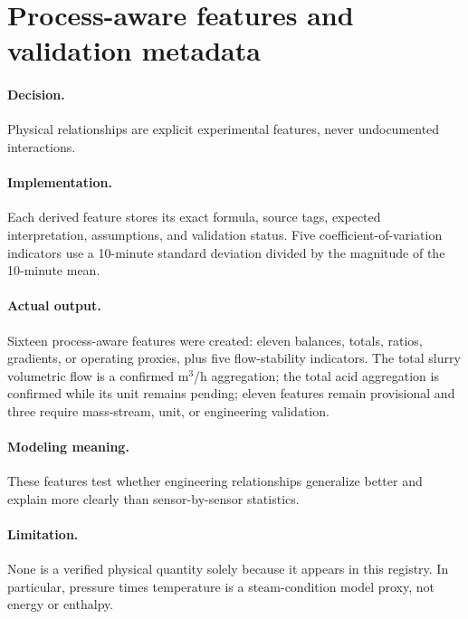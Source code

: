 \documentclass[10pt,a4paper]{article}
\newcommand{\decision}{\paragraph{Decision.}}
\newcommand{\implementation}{\paragraph{Implementation.}}
\newcommand{\actual}{\paragraph{Actual output.}}
\newcommand{\modelmeaning}{\paragraph{Modeling meaning.}}
\newcommand{\limitation}{\paragraph{Limitation.}}
\begin{document}
\section{Process-aware features and validation metadata}
\decision Physical relationships are explicit experimental features, never undocumented interactions.
\implementation Each derived feature stores its exact formula, source tags, expected interpretation, assumptions, and validation status. Five coefficient-of-variation indicators use a 10-minute standard deviation divided by the magnitude of the 10-minute mean.
\actual Sixteen process-aware features were created: eleven balances, totals, ratios, gradients, or operating proxies, plus five flow-stability indicators. The total slurry volumetric flow is a confirmed m$^3$/h aggregation; the total acid aggregation is confirmed while its unit remains pending; eleven features remain provisional and three require mass-stream, unit, or engineering validation.
\modelmeaning These features test whether engineering relationships generalize better and explain more clearly than sensor-by-sensor statistics.
\limitation None is a verified physical quantity solely because it appears in this registry. In particular, pressure times temperature is a steam-condition model proxy, not energy or enthalpy.
\end{document}
